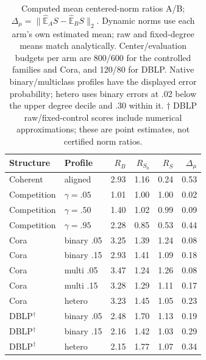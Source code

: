\begin{table}[htbp]
\centering\small
\setlength{\tabcolsep}{4pt}
\begin{tabular}{llrrrr}
\toprule
Structure & Profile & $R_B$ & $R_{S_0}$ & $R_S$ & $\Delta_\mu$ \\
\midrule
Coherent & aligned & 2.93 & 1.16 & 0.24 & 0.53 \\
Competition & $\gamma=.05$ & 1.01 & 1.00 & 1.00 & 0.02 \\
Competition & $\gamma=.50$ & 1.40 & 1.02 & 0.99 & 0.09 \\
Competition & $\gamma=.95$ & 2.28 & 0.85 & 0.53 & 0.44 \\
Cora & binary .05 & 3.25 & 1.39 & 1.24 & 0.08 \\
Cora & binary .15 & 2.93 & 1.41 & 1.09 & 0.18 \\
Cora & multi .05 & 3.47 & 1.24 & 1.26 & 0.08 \\
Cora & multi .15 & 3.28 & 1.29 & 1.11 & 0.17 \\
Cora & hetero & 3.23 & 1.45 & 1.05 & 0.23 \\
DBLP$^\dagger$ & binary .05 & 2.48 & 1.70 & 1.13 & 0.19 \\
DBLP$^\dagger$ & binary .15 & 2.16 & 1.42 & 1.03 & 0.29 \\
DBLP$^\dagger$ & hetero & 2.15 & 1.77 & 1.07 & 0.34 \\
\bottomrule
\end{tabular}
\caption{Computed mean centered-norm ratios A/B; $\Delta_\mu=\|\widehat{\mathbb E}_A S-\widehat{\mathbb E}_B S\|_2$. Dynamic norms use each arm's own estimated mean; raw and fixed-degree means match analytically. Center/evaluation budgets per arm are 800/600 for the controlled families and Cora, and 120/80 for DBLP. Native binary/multiclass profiles have the displayed error probability; hetero uses binary errors at .02 below the upper degree decile and .30 within it. $\dagger$ DBLP raw/fixed-control scores include numerical approximations; these are point estimates, not certified norm ratios.}
\label{tab:normalization}
\end{table}
